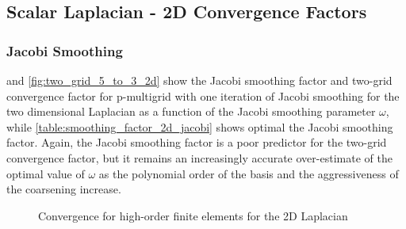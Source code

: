 \documentclass[review]{siamart190516}
\begin{document}
\subsection{Scalar Laplacian - 2D Convergence Factors}\label{sec:2dresults}

\subsubsection{Jacobi Smoothing}

 and \cref{fig:two_grid_5_to_3_2d} show the Jacobi smoothing factor and two-grid convergence factor for p-multigrid with one iteration of Jacobi smoothing for the two dimensional Laplacian as a function of the Jacobi smoothing parameter $\omega$, while \cref{table:smoothing_factor_2d_jacobi} shows optimal the Jacobi smoothing factor.
Again, the Jacobi smoothing factor is a poor predictor for the two-grid convergence factor, but it remains an increasingly accurate over-estimate of the optimal value of $\omega$ as the polynomial order of the basis and the aggressiveness of the coarsening increase.

\begin{figure}[!tbp]
  \centering
  \hfill
  \caption{Convergence for high-order finite elements for the 2D Laplacian}
\end{figure}
\end{document}
